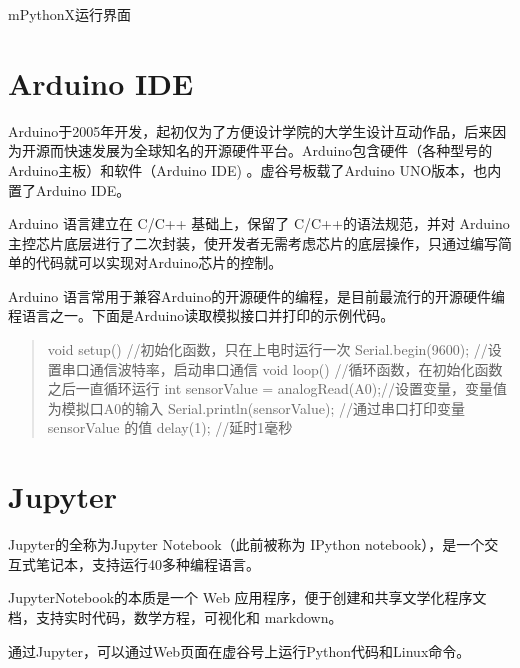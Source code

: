 \documentclass[letterpaper,10pt,english]{sphinxmanual}
\begin{document}
mPythonX运行界面

\noindent{}


\section{Arduino IDE}
\label{\detokenize{05.soft/5.3-arduino:arduino-ide}}\label{\detokenize{05.soft/5.3-arduino::doc}}
Arduino于2005年开发，起初仅为了方便设计学院的大学生设计互动作品，后来因为开源而快速发展为全球知名的开源硬件平台。Arduino包含硬件（各种型号的Arduino主板）和软件（Arduino IDE) 。虚谷号板载了Arduino UNO版本，也内置了Arduino IDE。

Arduino 语言建立在 C/C++ 基础上，保留了 C/C++的语法规范，并对 Arduino主控芯片底层进行了二次封装，使开发者无需考虑芯片的底层操作，只通过编写简单的代码就可以实现对Arduino芯片的控制。

Arduino 语言常用于兼容Arduino的开源硬件的编程，是目前最流行的开源硬件编程语言之一。下面是Arduino读取模拟接口并打印的示例代码。
\begin{quote}

\begin{sphinxVerbatim}[commandchars=\\\{\}]
void setup() \PYGZob{}                          //初始化函数，只在上电时运行一次
        Serial.begin(9600);             //设置串口通信波特率，启动串口通信
\PYGZcb{}
void loop() \PYGZob{}                           //循环函数，在初始化函数之后一直循环运行
        int sensorValue = analogRead(A0);//设置变量，变量值为模拟口A0的输入
        Serial.println(sensorValue);            //通过串口打印变量sensorValue 的值
        delay(1);                                                       //延时1毫秒
\PYGZcb{}
\end{sphinxVerbatim}
\end{quote}


\section{Jupyter}
\label{\detokenize{05.soft/5.4-Jupyter:jupyter}}\label{\detokenize{05.soft/5.4-Jupyter::doc}}
Jupyter的全称为Jupyter Notebook（此前被称为 IPython notebook），是一个交互式笔记本，支持运行40多种编程语言。

JupyterNotebook的本质是一个 Web 应用程序，便于创建和共享文学化程序文档，支持实时代码，数学方程，可视化和 markdown。

通过Jupyter，可以通过Web页面在虚谷号上运行Python代码和Linux命令。
\end{document}

